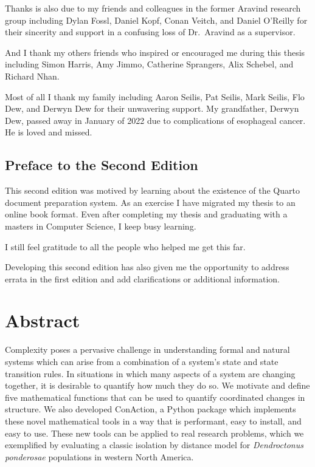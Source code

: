 \documentclass[
  letterpaper,
  DIV=11,
  numbers=noendperiod]{scrreprt}
\begin{document}
Thanks is also due to my friends and colleagues in the former Aravind
research group including Dylan Fossl, Daniel Kopf, Conan Veitch, and
Daniel O'Reilly for their sincerity and support in a confusing loss of
Dr.~Aravind as a supervisor.

And I thank my others friends who inspired or encouraged me during this
thesis including Simon Harris, Amy Jimmo, Catherine Sprangers, Alix
Schebel, and Richard Nhan.

Most of all I thank my family including Aaron Seilis, Pat Seilis, Mark
Seilis, Flo Dew, and Derwyn Dew for their unwavering support. My
grandfather, Derwyn Dew, passed away in January of 2022 due to
complications of esophageal cancer. He is loved and missed.

\section*{Preface to the Second
Edition}\label{preface-to-the-second-edition}


This second edition was motived by learning about the existence of the
Quarto document preparation system. As an exercise I have migrated my
thesis to an online book format. Even after completing my thesis and
graduating with a masters in Computer Science, I keep busy learning.

I still feel gratitude to all the people who helped me get this far.

Developing this second edition has also given me the opportunity to
address errata in the first edition and add clarifications or additional
information.


\chapter{Abstract}\label{abstract}

Complexity poses a pervasive challenge in understanding formal and
natural systems which can arise from a combination of a system's state
and state transition rules. In situations in which many aspects of a
system are changing together, it is desirable to quantify how much they
do so. We motivate and define five mathematical functions that can be
used to quantify coordinated changes in structure. We also developed
ConAction, a Python package which implements these novel mathematical
tools in a way that is performant, easy to install, and easy to use.
These new tools can be applied to real research problems, which we
exemplified by evaluating a classic isolation by distance model for
\emph{Dendroctonus ponderosae} populations in western North America.
\end{document}
